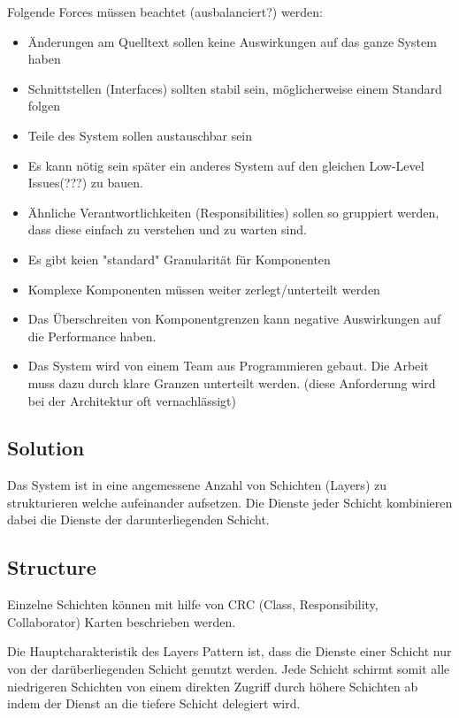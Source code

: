 Folgende Forces müssen beachtet (ausbalanciert?) werden:

\begin{itemize}
	\item Änderungen am Quelltext sollen keine Auswirkungen auf das ganze System haben
	\item Schnittstellen (Interfaces) sollten stabil sein, möglicherweise einem Standard folgen
	\item Teile des System sollen austauschbar sein
	\item Es kann nötig sein später ein anderes System auf den gleichen Low-Level Issues(???) zu bauen.
	\item Ähnliche Verantwortlichkeiten (Responsibilities) sollen so gruppiert werden, dass diese einfach zu verstehen und zu warten sind.
	\item Es gibt keien "standard" Granularität für Komponenten
	\item Komplexe Komponenten müssen weiter zerlegt/unterteilt werden
	\item Das Überschreiten von Komponentgrenzen kann negative Auswirkungen auf die Performance haben.
	\item Das System wird von einem Team aus Programmieren gebaut. Die Arbeit muss dazu durch klare Granzen unterteilt werden. (diese Anforderung wird bei der Architektur oft vernachlässigt)
\end{itemize}

\subsection*{Solution}


Das System ist in eine angemessene Anzahl von Schichten (Layers) zu strukturieren  welche aufeinander aufsetzen. Die Dienste jeder Schicht kombinieren dabei die Dienste der darunterliegenden Schicht.

\subsection*{Structure}


Einzelne Schichten können mit hilfe von CRC (Class, Responsibility, Collaborator) Karten beschrieben werden.

Die Hauptcharakteristik des Layers Pattern ist, dass die Dienste einer Schicht nur von der darüberliegenden Schicht genutzt werden. Jede Schicht schirmt somit alle niedrigeren Schichten von einem direkten Zugriff durch höhere Schichten ab indem der Dienst an die tiefere Schicht delegiert wird.

